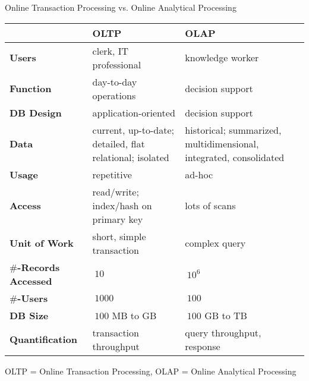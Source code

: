 \begin{frame}{Online Transaction Processing vs. Online Analytical Processing}
	\vspace{-0.5em}
	\begin{tabularx}{\textwidth}{|b|X|X|}
		\rowcolor{faugray!62}          & \textbf{OLTP}                                            & \textbf{OLAP}                                                      \\\hline
		\textbf{Users}                 & clerk, IT professional                                   & knowledge worker                                                   \\ \hline
		\textbf{Function}              & day-to-day operations                                    & decision support                                                   \\ \hline
		\textbf{DB Design}             & application-oriented                                     & decision support                                                   \\ \hline
		\textbf{Data}                  & current, up-to-date; detailed, flat relational; isolated & historical; summarized, multidimensional, integrated, consolidated \\ \hline
		\textbf{Usage}                 & repetitive                                               & ad-hoc                                                             \\ \hline
		\textbf{Access}                & read/write; index/hash on primary key                    & lots of scans                                                      \\ \hline
		\textbf{Unit of Work}          & short, simple transaction                                & complex query                                                      \\ \hline
		\textbf{$\#$-Records Accessed} & $~ 10$                                                   & $~ 10^6$                                                           \\ \hline
		\textbf{$\#$-Users}            & $~ 1000$                                                 & $~ 100$                                                            \\ \hline
		\textbf{DB Size}               & $~ 100$ MB to GB                                         & $~ 100$ GB to TB                                                   \\ \hline
		\textbf{Quantification}        & transaction throughput                                   & query throughput, response                                         \\ \hline
	\end{tabularx}

	{\tiny OLTP = Online Transaction Processing, OLAP = Online Analytical Processing}
\end{frame}

